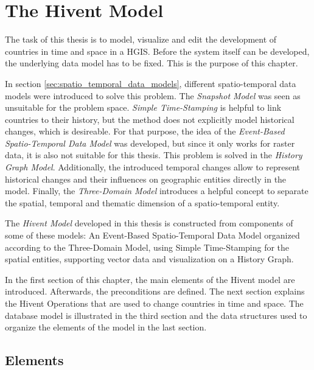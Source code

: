 
\chapter{The Hivent Model} %
\label{cha:the_hivent_model}

The task of this thesis is to model, visualize and edit the development of countries in time and space in a HGIS. Before the system itself can be developed, the underlying data model has to be fixed. This is the purpose of this chapter.

In section \ref{sec:spatio_temporal_data_models}, different spatio-temporal data models were introduced to solve this problem. The \emph{Snapshot Model} was seen as unsuitable for the problem space. \emph{Simple Time-Stamping} is helpful to link countries to their history, but the method does not explicitly model historical changes, which is desireable. For that purpose, the idea of the \emph{Event-Based Spatio-Temporal Data Model} was developed, but since it only works for raster data, it is also not suitable for this thesis. This problem is solved in the \emph{History Graph Model}. Additionally, the introduced temporal changes allow to represent historical changes and their influences on geographic entities directly in the model. Finally, the \emph{Three-Domain Model} introduces a helpful concept to separate the spatial, temporal and thematic dimension of a spatio-temporal entity.

The \emph{Hivent Model} developed in this thesis is constructed from components of some of these models: An Event-Based Spatio-Temporal Data Model organized according to the Three-Domain Model, using Simple Time-Stamping for the spatial entities, supporting vector data and visualization on a History Graph.

In the first section of this chapter, the main elements of the Hivent model are introduced. Afterwards, the preconditions are defined. The next section explains the Hivent Operations that are used to change countries in time and space. The database model is illustrated in the third section and the data structures used to organize the elements of the model in the last section.

\section{Elements} %
\label{sec:elements}

